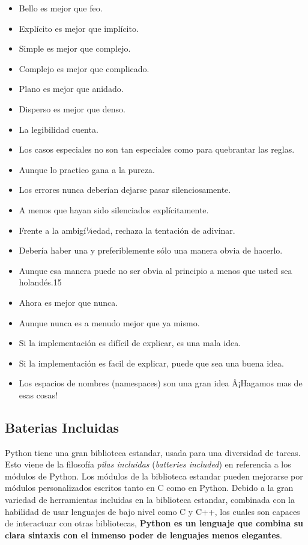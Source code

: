 \begin{itemize}
    \item Bello es mejor que feo.
    \item Explí­cito es mejor que implí­cito.
    \item Simple es mejor que complejo.
    \item Complejo es mejor que complicado.
    \item Plano es mejor que anidado.
    \item Disperso es mejor que denso.
    \item La legibilidad cuenta.
    \item Los casos especiales no son tan especiales como para quebrantar las reglas.
    \item Aunque lo practico gana a la pureza.
    \item Los errores nunca deberí­an dejarse pasar silenciosamente.
    \item A menos que hayan sido silenciados explí­citamente.
    \item Frente a la ambigí¼edad, rechaza la tentación de adivinar.
    \item Deberí­a haber una y preferiblemente sólo una manera obvia de hacerlo.
    \item Aunque esa manera puede no ser obvia al principio a menos que usted sea holandés.15
    \item Ahora es mejor que nunca.
    \item Aunque nunca es a menudo mejor que ya mismo.
    \item Si la implementación es difí­cil de explicar, es una mala idea.
    \item Si la implementación es facil de explicar, puede que sea una buena idea.
    \item Los espacios de nombres (namespaces) son una gran idea Â¡Hagamos mas de esas cosas!
\end{itemize}


\subsection{Baterias Incluidas}

Python tiene una gran biblioteca estandar, usada para una diversidad de tareas. Esto viene de la filosofía \textit{pilas incluidas} (\textit{batteries included}) en referencia a los módulos de Python. Los módulos de la biblioteca estandar pueden mejorarse por módulos personalizados escritos tanto en C como en Python. Debido a la gran variedad de herramientas incluidas en la biblioteca estandar, combinada con la habilidad de usar lenguajes de bajo nivel como C y C++, los cuales son capaces de interactuar con otras bibliotecas, {\bfseries Python es un lenguaje que combina su clara sintaxis con el inmenso poder de lenguajes menos elegantes}.

